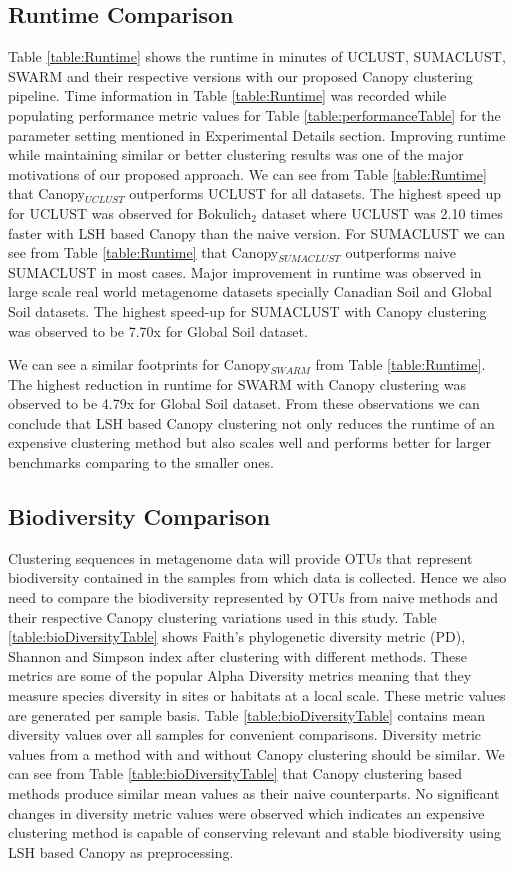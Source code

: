 \documentclass[10pt, conference, compsocconf]{IEEEtran}
\begin{document}
\subsection{\textbf{Runtime Comparison}} Table \ref{table:Runtime} shows the runtime in minutes of UCLUST, SUMACLUST, SWARM and their respective versions with our proposed Canopy clustering pipeline. Time information in Table \ref{table:Runtime} was recorded while populating performance metric values for Table \ref{table:performanceTable} for the parameter setting mentioned in Experimental Details section. Improving runtime while maintaining similar or better clustering results was one of the major motivations of our proposed approach. We can see from Table \ref{table:Runtime} that Canopy$_{UCLUST}$ outperforms UCLUST for all datasets. The highest speed up for UCLUST was observed for Bokulich$_2$ dataset where UCLUST was 2.10 times faster with LSH based Canopy than the naive version. For SUMACLUST we can see from Table \ref{table:Runtime} that Canopy$_{SUMACLUST}$ outperforms naive SUMACLUST in most cases. Major improvement in runtime was observed in large scale real world metagenome datasets specially Canadian Soil and Global Soil datasets. The highest speed-up for SUMACLUST with Canopy clustering was observed to be 7.70x for Global Soil dataset.

We can see a similar footprints for Canopy$_{SWARM}$ from Table \ref{table:Runtime}. The highest reduction in runtime for SWARM with Canopy clustering was observed to be 4.79x for Global Soil dataset. From these observations we can conclude that LSH based Canopy clustering not only reduces the runtime of an expensive clustering method but also scales well and performs better for larger benchmarks comparing to the smaller ones.   

\subsection{\textbf{Biodiversity Comparison}} Clustering sequences in metagenome data will provide OTUs that represent biodiversity contained in the samples from which data is collected. Hence we also need to compare the biodiversity represented by OTUs from naive methods and their respective Canopy clustering variations used in this study. Table \ref{table:bioDiversityTable} shows Faith’s phylogenetic diversity metric (PD), Shannon and Simpson index after clustering with different methods. These metrics are some of the popular Alpha Diversity metrics meaning that they measure species diversity in sites or habitats at a local scale. These metric values are generated per sample basis. Table \ref{table:bioDiversityTable} contains mean diversity values over all samples for convenient comparisons. Diversity metric values from a method with and without Canopy clustering should be similar. We can see from Table \ref{table:bioDiversityTable} that Canopy clustering based methods produce similar mean values as their naive counterparts. No significant changes in diversity metric values were observed which indicates an expensive clustering method is capable of conserving relevant and stable biodiversity using LSH based Canopy as preprocessing.           
\end{document}
